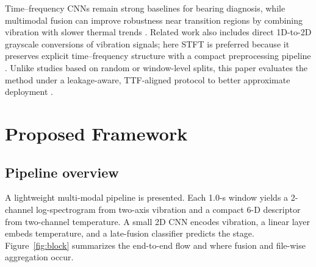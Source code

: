 \documentclass[pdflatex,sn-mathphys-num]{sn-jnl}%
\begin{document}
Time--frequency CNNs remain strong baselines for bearing diagnosis, while multimodal fusion can improve robustness near transition regions by combining vibration with slower thermal trends \cite{zhao2019deep,lei2020roadmap,ince2016tie,wen2018neurocomputing,shao2019tii_transfer,baltrusaitis2019multimodal,huo2022tim_multisensor,gao2024inffus_multisource,xiao2025inffus_multilevel,li2025vibtemp_degradation}. Related work also includes direct 1D-to-2D grayscale conversions of vibration signals; here STFT is preferred because it preserves explicit time--frequency structure with a compact preprocessing pipeline \cite{wen2018neurocomputing}. Unlike studies based on random or window-level splits, this paper evaluates the method under a leakage-aware, TTF-aligned protocol to better approximate deployment \cite{kaufman2012leakage,bergmeir2012timeseriescv}.

\section{Proposed Framework}
\label{sec:framework}

\subsection{Pipeline overview}
A lightweight multi-modal pipeline is presented. Each 1.0-s window yields a 2-channel log-spectrogram from two-axis vibration and a compact 6-D descriptor from two-channel temperature. A small 2D CNN encodes vibration, a linear layer embeds temperature, and a late-fusion classifier predicts the stage. Figure~\ref{fig:block} summarizes the end-to-end flow and where fusion and file-wise aggregation occur.
\end{document}
